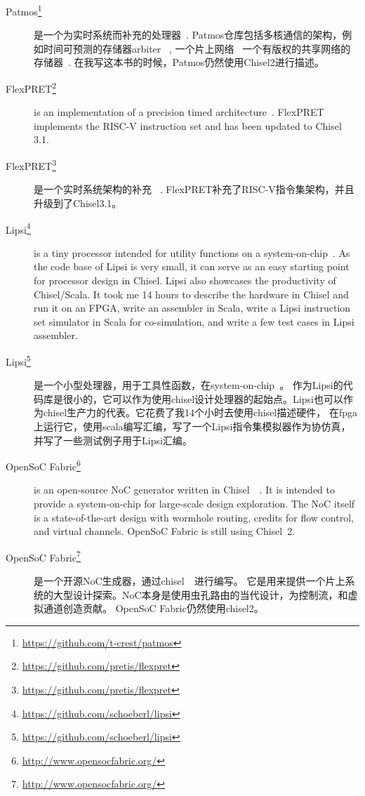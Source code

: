 \documentclass[%
    10pt,
    headinclude, footexclude,
    openright, %
    notitlepage,
    cleardoubleempty,
    headsepline,
    pointlessnumbers,
    bibtotoc, idxtotoc,
    ]{scrbook}
\newcommand{\myref}[2]{\href{#1}{#2}}
\renewcommand{\myref}[2]{{#2}{\footnote{\url{#1}}}}
\begin{document}
{\begin{description}
\item[\myref{https://github.com/t-crest/patmos}{Patmos}] 是一个为实时系统而补充的处理器~\cite{patmos:rts2018}.
Patmos仓库包括多核通信的架构，例如时间可预测的存储器arbiter~\cite{t-crest:memnoc}
, 一个片上网络~\cite{s4nocni:arcs2019}
一个有版权的共享网络的存储器~\cite{t-crest:ownspm}.
在我写这本书的时候，Patmos仍然使用Chisel2进行描述。

\item[\myref{https://github.com/pretis/flexpret}{FlexPRET}] is an implementation of a
precision timed architecture~\cite{Zimmer:EECS-2015-181}. FlexPRET implements
the RISC-V instruction set and has been updated to Chisel 3.1.

\item[\myref{https://github.com/pretis/flexpret}{FlexPRET}] 是一个实时系统架构的补充
~\cite{Zimmer:EECS-2015-181}. FlexPRET补充了RISC-V指令集架构，并且升级到了Chisel3.1。

\item[\myref{https://github.com/schoeberl/lipsi}{Lipsi}] is a tiny processor intended
for utility functions on a system-on-chip~\cite{lipsi:arcs2018}. As the code base of
Lipsi is very small, it can serve as an easy starting point for processor design in Chisel.
Lipsi also showcases the productivity of Chisel/Scala. It took me 14 hours to describe the
hardware in Chisel and run it on an FPGA, write an assembler in Scala, write a
Lipsi instruction set simulator in Scala for co-simulation, and write a few test cases
in Lipsi assembler.

\item[\myref{https://github.com/schoeberl/lipsi}{Lipsi}]是一个小型处理器，用于工具性函数，在system-on-chip~\cite{lipsi:arcs2018}。
作为Lipsi的代码库是很小的，它可以作为使用chisel设计处理器的起始点。Lipsi也可以作为chisel生产力的代表。它花费了我14个小时去使用chisel描述硬件，
在fpga上运行它，使用scala编写汇编，写了一个Lipsi指令集模拟器作为协仿真，并写了一些测试例子用于Lipsi汇编。

\item[\myref{http://www.opensocfabric.org/}{OpenSoC Fabric}] is an open-source NoC
generator written in Chisel~~\cite{OpenSoC:ispass2016}. It is intended to provide a
system-on-chip for large-scale design exploration. The NoC itself is a state-of-the-art design with wormhole routing, credits for flow control, and virtual channels.
OpenSoC Fabric is still using Chisel~2.

\item[\myref{http://www.opensocfabric.org/}{OpenSoC Fabric}] 是一个开源NoC生成器，通过chisel~~\cite{OpenSoC:ispass2016}进行编写。
它是用来提供一个片上系统的大型设计探索。NoC本身是使用虫孔路由的当代设计，为控制流，和虚拟通道创造贡献。
OpenSoC Fabric仍然使用chisel2。



\end{description}}
\end{document}

